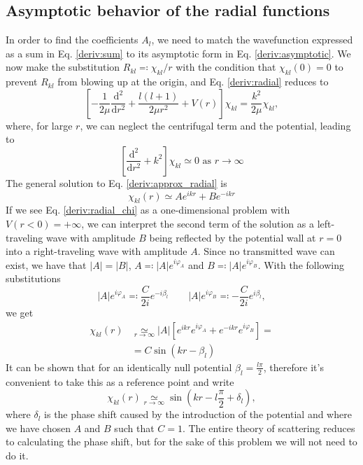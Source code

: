 \subsection{Asymptotic behavior of the radial functions}
In order to find the coefficients \(A_l\), we need to match the wavefunction expressed as a sum in Eq. \eqref{deriv:sum} to its asymptotic form in Eq. \eqref{deriv:asymptotic}. We now make the substitution \(R_{kl} \eqqcolon \chi_{kl} / r\) with the condition that \(\chi_{kl} (0)=0\) to prevent \(R_{kl} \) from blowing up at the origin, and Eq. \eqref{deriv:radial} reduces to
\begin{equation}\label{deriv:radial_chi}
	\left[- \frac{1}{2\mu }\frac{\mathrm{d}^2}{\mathrm{d}r^2} + \frac{l(l+1)}{2\mu r^2}+ V(r)\right]\chi_{kl} = \frac{k^2}{2\mu }\chi_{kl},
\end{equation}
where, for large \(r\), we can neglect the centrifugal term and the potential, leading to
\begin{equation}\label{deriv:approx_radial}
	\left[ \frac{\mathrm{d}^2}{\mathrm{d}r^2} + k^2  \right] \chi_{kl}  \simeq 0 \text{ as } r \to \infty 
\end{equation}
The general solution to Eq. \eqref{deriv:approx_radial} is
\begin{equation}
	\chi_{kl} (r) \simeq A e^{ikr} + B e^{-ikr}
\end{equation}
If we see Eq. \eqref{deriv:radial_chi} as a one-dimensional problem with \(V(r < 0) = +\infty \), we can interpret the second term of the solution as a left-traveling wave with amplitude \(B\) being reflected by the potential wall at \(r=0\) into a right-traveling wave with amplitude \(A\). Since no transmitted wave can exist, we have that \(\vert A \vert = \vert B \vert \), \(A\eqqcolon \vert A \vert e^{i\varphi_A} \) and \(B \eqqcolon  \vert A \vert e^{i\varphi_B}\). With the following substitutions
\begin{equation}
	\vert A \vert e^{i \varphi_A} \eqqcolon \frac{C}{2i} e^{-i \beta_l}
	\qquad
	\vert A \vert e^{i \varphi _B} \eqqcolon - \frac{C}{2i} e^{i \beta _l},
\end{equation}
we get
\begin{align}
	\chi_{kl}(r) &\underset{r \to \infty }{\simeq} \vert A \vert \left[ e^{ikr} e^{i \varphi_A}+ e^{-ikr} e^{i \varphi_B} \right] =\\
	&= C \sin (kr - \beta _l)
\end{align}
It can be shown \cite{cohen-tannoudji} that for an identically null potential \(\beta _l = \frac{l \pi }{2}\), therefore it's convenient to take this as a reference point and write
\begin{equation}\label{deriv:chi_asymptotic}
	\chi_{kl} (r) \underset{r \to \infty }{\simeq} \sin\left(kr- l \frac{\pi}{2} + \delta _l\right),
\end{equation}
where \(\delta _l\) is the phase shift caused by the introduction of the potential and where we have chosen \(A\) and \(B\) such that \(C=1\). The entire theory of scattering reduces to calculating the phase shift, but for the sake of this problem we will not need to do it.

